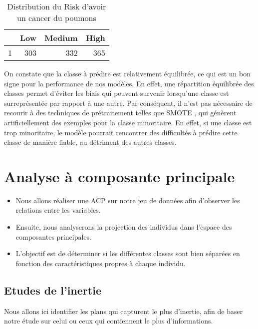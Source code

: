 \documentclass[a4paper,11pt]{article}
\begin{document}
\begin{center}

\begin{table}[ht]
\centering
\begin{tabular}{rrrr}
  \hline
 & Low & Medium & High \\ 
  \hline
1 & 303 & 332 & 365 \\ 
   \hline
\end{tabular}
\caption{Distribution du Risk d'avoir un cancer du poumons} 
\end{table}\end{center}

On constate que la classe à prédire est relativement équilibrée, ce qui est un bon signe pour la performance de nos modèles. En effet, une répartition équilibrée des classes permet d'éviter les biais qui peuvent survenir lorsqu'une classe est surreprésentée par rapport à une autre. Par conséquent, il n'est pas nécessaire de recourir à des techniques de prétraitement telles que SMOTE , qui génèrent artificiellement des exemples pour la classe minoritaire. En effet, si une classe est trop minoritaire, le modèle pourrait rencontrer des difficultés à prédire cette classe de manière fiable, au détriment des autres classes.


\newpage

\section{Analyse à composante principale}


\begin{itemize}
  \item Nous allons réaliser une ACP sur notre jeu de données afin d’observer les relations entre les variables.
  \item Ensuite, nous analyserons la projection des individus dans l’espace des composantes principales.
  \item L’objectif est de déterminer si les différentes classes sont bien séparées en fonction des caractéristiques propres à chaque individu.
\end{itemize}

\subsection{Etudes de l'inertie}

Nous allons ici identifier les plans qui capturent le plus d’inertie, afin de baser notre étude sur celui ou ceux qui contiennent le plus d'informations.
\end{document}
